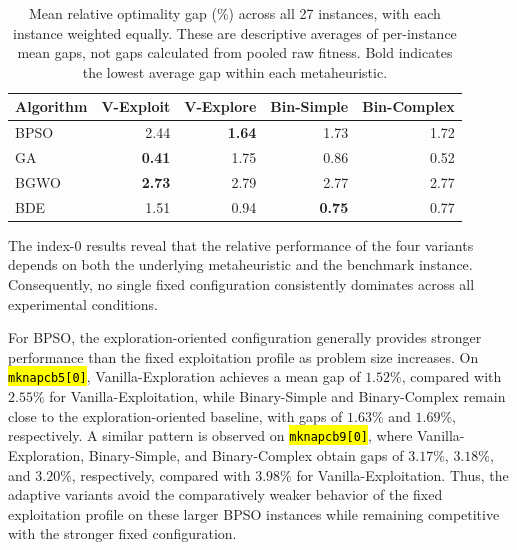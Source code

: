 \documentclass[mathematics,article,accept,moreauthors]{Definitions/mdpi}
\begin{document}
\vspace{-9pt}



\begin{table}[H]
  \small
  \caption{Mean relative optimality gap (\%) across all 27 instances,
  with each instance weighted equally. These are descriptive averages of
  per-instance mean gaps, not gaps calculated from pooled raw fitness.
  Bold indicates the lowest average gap within each metaheuristic.}
  \label{tab:gap_all_instances}


  \begin{tabularx}{\textwidth}{lRRRR}
    \toprule
    \textbf{Algorithm} & \textbf{V-Exploit} & \textbf{V-Explore} & \textbf{Bin-Simple} & \textbf{Bin-Complex} \\
    \midrule
    BPSO & 2.44 & \textbf{{1.64}} & 1.73 & 1.72 \\
    GA & \textbf{{0.41}} & 1.75 & 0.86 & 0.52 \\
    BGWO & \textbf{{2.73}} & 2.79 & 2.77 & 2.77 \\
    BDE & 1.51 & 0.94 & \textbf{{0.75}} & 0.77 \\
    \bottomrule
  \end{tabularx}
\end{table}



The index-$0$ results reveal that the relative performance of the four variants depends
on both the underlying metaheuristic and the benchmark instance. Consequently,
no single fixed configuration consistently dominates across all experimental
conditions.

For BPSO, the exploration-oriented configuration generally provides stronger
performance than the fixed exploitation profile as problem size increases.
On \texttt{\hl{mknapcb5[0]}}, Vanilla-Exploration achieves a mean gap of $1.52\%$,
compared with $2.55\%$ for Vanilla-Exploitation, while Binary-Simple and
Binary-Complex remain close to the exploration-oriented baseline, with gaps
of $1.63\%$ and $1.69\%$, respectively. A similar pattern is observed on
\texttt{\hl{mknapcb9[0]}}, where Vanilla-Exploration, Binary-Simple, and
Binary-Complex obtain gaps of $3.17\%$, $3.18\%$, and $3.20\%$,
respectively, compared with $3.98\%$ for Vanilla-Exploitation. Thus, the
adaptive variants avoid the comparatively weaker behavior of the fixed
exploitation profile on these larger BPSO instances while remaining
competitive with the stronger fixed configuration.
\end{document}
